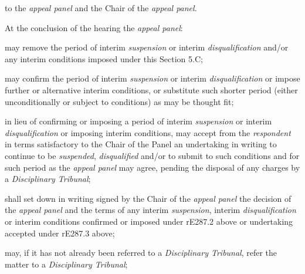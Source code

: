 to the \emph{appeal panel} and the Chair of the \emph{appeal panel}.\\
\par
At the conclusion of the hearing the \emph{appeal panel}:\\\nl \item may remove the period of interim \emph{suspension} or
interim \emph{disqualification} and/or any interim conditions imposed
under this\textbf{ }Section\textbf{ }5.C;\item may confirm the period of interim \emph{suspension} or
interim \emph{disqualification} or impose further or alternative interim
conditions, or substitute such shorter period (either unconditionally or
subject to conditions) as may be thought fit;\item in lieu of confirming or imposing a period of
interim \emph{suspension} or interim \emph{disqualification} or imposing
interim conditions, may accept from the \emph{respondent} in terms
satisfactory to the Chair of the Panel an undertaking in writing to
continue to be \emph{suspended}, \emph{disqualified} and/or to submit to
such conditions and for such period as the \emph{appeal panel} may
agree, pending the disposal of any charges by a \emph{Disciplinary
Tribunal};\item shall set down in writing signed by the Chair of the \emph{appeal
panel} the decision of the \emph{appeal panel} and the terms of any
interim \emph{suspension}, interim \emph{disqualification} or interim
conditions confirmed or imposed under rE287.2 above or undertaking
accepted under rE287.3 above;\item may, if it has not already been referred to a \emph{Disciplinary
Tribunal}, refer the matter to a \emph{Disciplinary Tribunal};\ln

